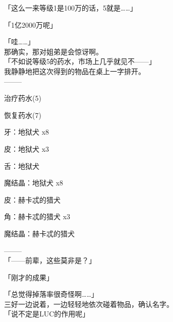 「这么一来等级1是100万的话，5就是……」

「1亿2000万呢」

「哇……」\\

那确实，那对姐弟是会惊讶啊。\\

「不如说等级5的药水，市场上几乎就见不——」\\

我静静地把这次得到的物品在桌上一字排开。\\

  --------

治疗药水(5)

恢复药水(7)

牙：地狱犬 x8

皮：地狱犬 x3

舌：地狱犬

魔结晶：地狱犬 x8

皮：赫卡忒的猎犬

角：赫卡忒的猎犬 x3

魔结晶：赫卡忒的猎犬

  --------\\

「——前辈，这些莫非是？」

「刚才的成果」

「总觉得掉落率很奇怪啊……」\\

三好一边说着，一边轻轻地依次碰着物品，确认名字。\\

「说不定是LUC的作用呢」\\


